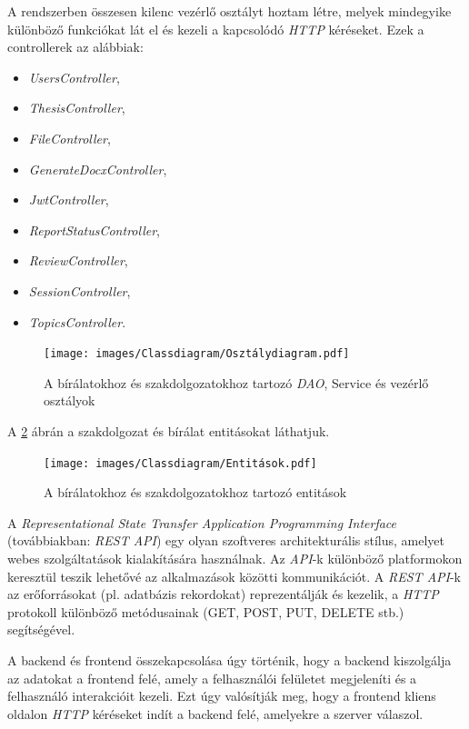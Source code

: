 A rendszerben összesen kilenc vezérlő osztályt hoztam létre, melyek mindegyike különböző funkciókat lát el és kezeli a kapcsolódó \textit{HTTP} kéréseket. Ezek a controllerek az alábbiak:
\begin{itemize}
\setlength\itemsep{0pt}
\item{\textit{UsersController}},
\item{\textit{ThesisController}},
\item{\textit{FileController}},
\item{\textit{GenerateDocxController}},
\item{\textit{JwtController}},
\item{\textit{ReportStatusController}},
\item{\textit{ReviewController}},
\item{\textit{SessionController}},
\item{\textit{TopicsController}}.

\end{itemize}
\begin{figure}[h!]
	\texttt{[image: images/Classdiagram/Osztálydiagram.pdf]}
	\caption{A bírálatokhoz és szakdolgozatokhoz tartozó \textit{DAO}, Service és vezérlő osztályok}
	\label{fig:Osztálydiagram}
\end{figure}
A \ref{fig:Entitások} ábrán a szakdolgozat és bírálat entitásokat láthatjuk. 
\begin{figure}[h!]
	\texttt{[image: images/Classdiagram/Entitások.pdf]}
	\caption{A bírálatokhoz és szakdolgozatokhoz tartozó entitások}
	\label{fig:Entitások}
\end{figure}

\newpage


A \textit{Representational State Transfer Application Programming Interface} (továbbiakban: \textit{REST API}) \cite{REST API} egy olyan szoftveres architekturális stílus, amelyet webes szolgáltatások kialakítására használnak. Az \textit{API}-k különböző platformokon keresztül teszik lehetővé az alkalmazások közötti kommunikációt. A \textit{REST API}-k \cite{REST API} az erőforrásokat (pl. adatbázis rekordokat) reprezentálják és kezelik, a \textit{HTTP} \cite{http} protokoll különböző metódusainak (GET, POST, PUT, DELETE stb.) segítségével.

A backend és frontend összekapcsolása úgy történik, hogy a backend kiszolgálja az adatokat a frontend felé, amely a felhasználói felületet megjeleníti és a felhasználó interakcióit kezeli. Ezt úgy valósítják meg, hogy a frontend kliens oldalon \textit{HTTP} kéréseket indít a backend felé, amelyekre a szerver válaszol.\\


